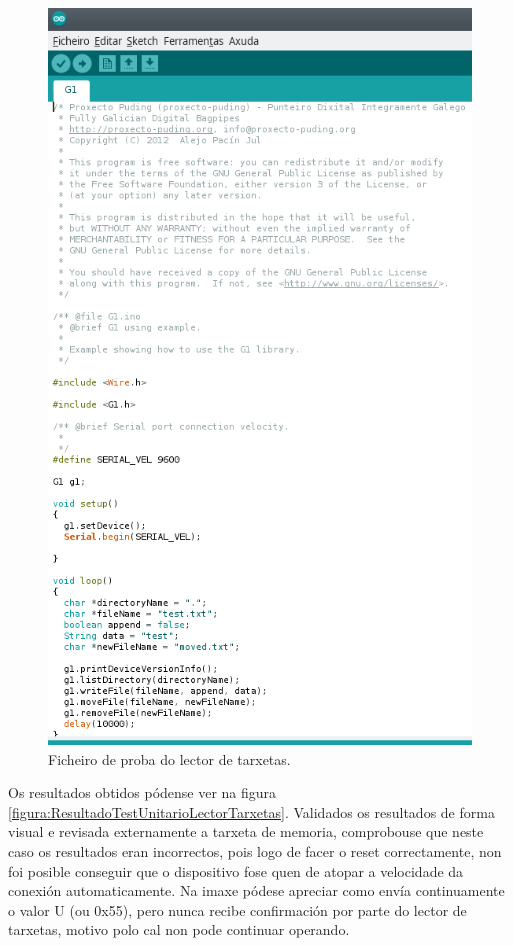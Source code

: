   \begin{figure}[htbp]
   \centering
   \includegraphics[scale=0.8,keepaspectratio=true]{./imagenes/test-lector-tarxetas.png}
   \caption{Ficheiro de proba do lector de tarxetas.}
   \label{figura:TestUnitarioLectorTarxetas}
  \end{figure}
  
  Os resultados obtidos pódense ver na figura
  \ref{figura:ResultadoTestUnitarioLectorTarxetas}. Validados os resultados
  de forma visual e revisada externamente a tarxeta de memoria, comprobouse que
  neste caso os resultados eran incorrectos, pois logo de facer o reset
  correctamente, non foi posible conseguir que o dispositivo fose quen de
  atopar a velocidade da conexión automaticamente. Na imaxe pódese apreciar como
  envía continuamente o valor U (ou 0x55), pero nunca recibe confirmación por
  parte do lector de tarxetas, motivo polo cal non pode continuar operando. \\
  
